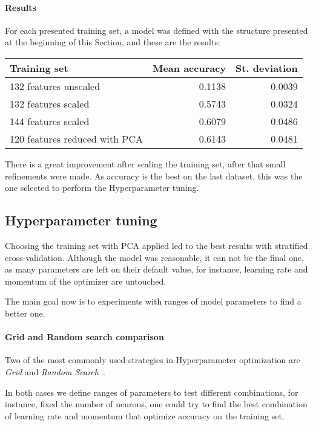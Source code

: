\paragraph{Results}
For each presented training set, a model was defined 
with the structure presented at the beginning of this Section, 
and these are the results:

\begin{center}
    \begin{tabular}{ |l|r|r| } 
        \hline
        Training set & Mean accuracy & St. deviation \\
        \hline
        132 features unscaled &  0.1138 & 0.0039 \\
        132 features scaled &  0.5743 & 0.0324 \\
        144 features scaled &  0.6079 & 0.0486 \\
        120 features reduced with PCA &  0.6143 & 0.0481 \\
        \hline
    \end{tabular}
\end{center}

There is a great improvement after scaling the training set, after 
that small refinements were made.
As accuracy is the best on the last dataset, this was the one selected to 
perform the Hyperparameter tuning.

\subsection{Hyperparameter tuning}

Choosing the training set with PCA applied led to the best results 
with stratified cross-validation. Although the model was reasonable, 
it can not be the final one, as many parameters are left on their default value, 
for instance, learning rate and momentum of the optimizer are untouched. 

The main goal now is to experiments with ranges of model parameters 
to find a better one.

\paragraph{Grid and Random search comparison}
Two of the most commonly used strategies in Hyperparameter optimization
are \emph{Grid} and \emph{Random Search}~\cite{random-grid}. 

In both cases we define ranges of parameters to test different combinations, 
for instance, fixed the number of neurons, one could try to find the best 
combination of learning rate and momentum that optimize accuracy on the training set.

